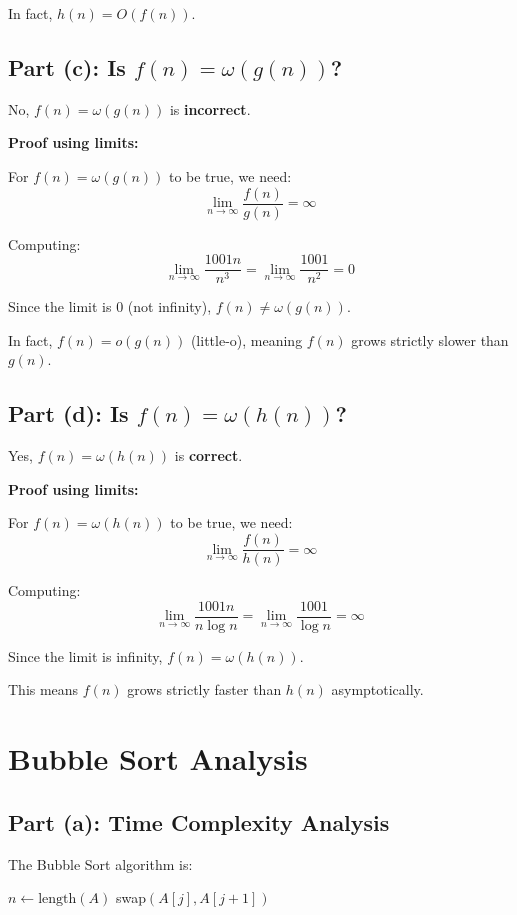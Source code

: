 \documentclass[12pt,a4paper]{article}
\begin{document}
In fact, $h(n) = O(f(n))$. \checkmark

\subsection{Part (c): Is $f(n) = \omega(g(n))$?}

No, $f(n) = \omega(g(n))$ is \textbf{incorrect}.

\textbf{Proof using limits:}

For $f(n) = \omega(g(n))$ to be true, we need:
\[\lim_{n \to \infty} \frac{f(n)}{g(n)} = \infty\]

Computing:
\[\lim_{n \to \infty} \frac{1001n}{n^3} = \lim_{n \to \infty} \frac{1001}{n^2} = 0\]

Since the limit is 0 (not infinity), $f(n) \neq \omega(g(n))$.

In fact, $f(n) = o(g(n))$ (little-o), meaning $f(n)$ grows strictly slower than $g(n)$. \checkmark

\subsection{Part (d): Is $f(n) = \omega(h(n))$?}

Yes, $f(n) = \omega(h(n))$ is \textbf{correct}.

\textbf{Proof using limits:}

For $f(n) = \omega(h(n))$ to be true, we need:
\[\lim_{n \to \infty} \frac{f(n)}{h(n)} = \infty\]

Computing:
\[\lim_{n \to \infty} \frac{1001n}{n\log n} = \lim_{n \to \infty} \frac{1001}{\log n} = \infty\]

Since the limit is infinity, $f(n) = \omega(h(n))$. \checkmark

This means $f(n)$ grows strictly faster than $h(n)$ asymptotically.

\section{Bubble Sort Analysis}

\subsection{Part (a): Time Complexity Analysis}

The Bubble Sort algorithm is:

\begin{algorithm}
\caption{Bubble Sort}
\begin{algorithmic}[1]
    \State $n \gets \text{length}(A)$
                \State swap$(A[j], A[j+1])$
            \EndIf
        \EndFor
    \EndFor
\EndProcedure
\end{algorithmic}
\end{algorithm}
\end{document}
